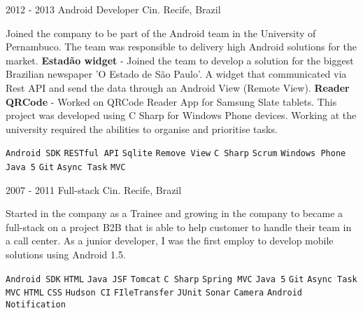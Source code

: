 \documentclass[9pt]{developercv} %
\begin{document}
\begin{entrylist}
	\entry
		{2012 -  2013}
		{Android Developer}
		{Cin. Recife, Brazil}
{

Joined the company to be part of the Android team in the University of Pernambuco. The team was responsible to delivery high Android solutions for the market.
\newline
\newline
\textbf{Estadão widget} - Joined the team to develop a solution for the biggest Brazilian newspaper ’O Estado de São Paulo’. A widget that communicated via Rest API and send the data through an Android View (Remote View). 
\newline
\newline
\textbf{Reader QRCode} - Worked on QRCode Reader App for Samsung Slate tablets. This project was developed using C Sharp for Windows Phone devices. Working at the university required the abilities to organise and prioritise tasks. 

 	{
 		\texttt{Android SDK}\slashsep
		 \texttt{RESTful API}\slashsep
		 \texttt{Sqlite}\slashsep
		 \texttt{Remove View}\slashsep
		 \texttt{C Sharp}\slashsep
		 \texttt{Scrum}\slashsep
		 \texttt{Windows Phone}\slashsep
		 \texttt{Java 5}\slashsep
		 \texttt{Git}\slashsep
		 \texttt{Async Task}\slashsep
		 \texttt{MVC}\slashsep
	}
}
\end{entrylist}
\begin{entrylist}
	\entry
		{2007 -  2011}
		{Full-stack}
		{Cin. Recife, Brazil}
{

Started in the company as a Trainee and growing in the company to became a full-stack on a project B2B that is able to help customer to handle their team in a call center. As a junior developer, I was the first employ to develop mobile solutions using Android 1.5.

 	{
 		\texttt{Android SDK}\slashsep
		 \texttt{HTML}\slashsep
		 \texttt{Java JSF}\slashsep
		 \texttt{Tomcat}\slashsep
		 \texttt{C Sharp}\slashsep
		 \texttt{Spring MVC}\slashsep
		 \texttt{Java 5}\slashsep
		 \texttt{Git}\slashsep
		 \texttt{Async Task}\slashsep
		 \texttt{MVC}\slashsep
		 \texttt{HTML}\slashsep
		 \texttt{CSS}\slashsep
		 \texttt{Hudson CI}\slashsep
		 \texttt{FIleTransfer}\slashsep
		 \texttt{JUnit}\slashsep
		 \texttt{Sonar}\slashsep
		 \texttt{Camera}\slashsep
		 \texttt{Android Notification}\slashsep
	}
}
\end{entrylist}
\end{document}

